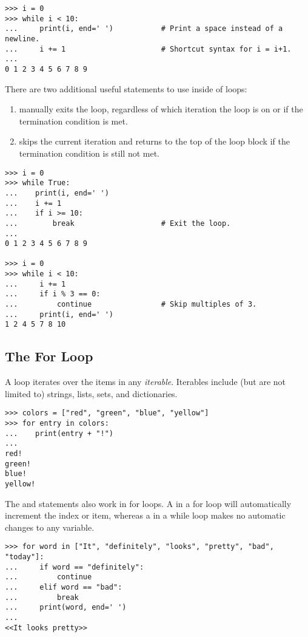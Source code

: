 \begin{lstlisting}
>>> i = 0
>>> while i < 10:
...     print(i, end=' ')           # Print a space instead of a newline.
...     i += 1                      # Shortcut syntax for i = i+1.
...
0 1 2 3 4 5 6 7 8 9
\end{lstlisting}

There are two additional useful statements to use inside of loops:
\begin{enumerate}
\item {} manually exits the loop, regardless of which iteration the loop is on or if the termination condition is met.
\item {} skips the current iteration and returns to the top of the loop block if the termination condition is still not met.
\end{enumerate}

\begin{lstlisting}
>>> i = 0
>>> while True:
...    print(i, end=' ')
...    i += 1
...    if i >= 10:
...        break                    # Exit the loop.
...
0 1 2 3 4 5 6 7 8 9

>>> i = 0
>>> while i < 10:
...     i += 1
...     if i % 3 == 0:
...         continue                # Skip multiples of 3.
...     print(i, end=' ')
1 2 4 5 7 8 10
\end{lstlisting}

\subsection*{The For Loop} %

A  loop iterates over the items in any \emph{iterable}.
Iterables include (but are not limited to) strings, lists, sets, and dictionaries.

\begin{lstlisting}
>>> colors = ["red", "green", "blue", "yellow"]
>>> for entry in colors:
...    print(entry + "!")
...
red!
green!
blue!
yellow!
\end{lstlisting}

The  and  statements also work in for loops.
A  in a for loop will automatically increment the index or item, whereas a  in a while loop makes no automatic changes to any variable.

\begin{lstlisting}
>>> for word in ["It", "definitely", "looks", "pretty", "bad", "today"]:
...     if word == "definitely":
...         continue
...     elif word == "bad":
...         break
...     print(word, end=' ')
...
<<It looks pretty>>
\end{lstlisting}

